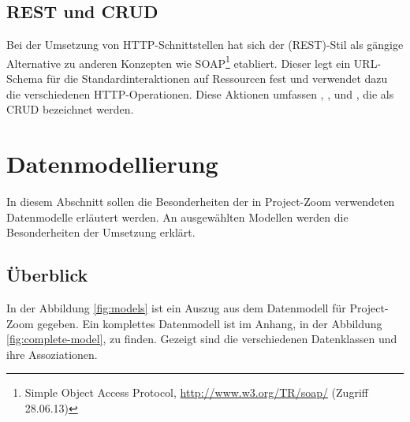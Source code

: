 \subsection{REST und CRUD}

Bei der Umsetzung von HTTP-Schnittstellen hat sich der  (REST)-Stil als gängige Alternative zu anderen Konzepten wie SOAP\footnote{Simple Object Access Protocol, \url{http://www.w3.org/TR/soap/} (Zugriff 28.06.13)} etabliert. Dieser legt ein URL-Schema für die Standardinteraktionen auf \gls{Ressource}n fest und verwendet dazu die verschiedenen HTTP-Operationen. Diese Aktionen umfassen , ,  und , die als CRUD bezeichnet werden.


\section{Datenmodellierung}
\label{sec:model}
In diesem Abschnitt sollen die Besonderheiten der in Project-Zoom verwendeten Datenmodelle erläutert werden. An ausgewählten Modellen werden die Besonderheiten der Umsetzung erklärt.

\subsection{Überblick}

In der Abbildung \ref{fig:models} ist ein Auszug aus dem Datenmodell für Project-Zoom gegeben. Ein komplettes Datenmodell ist im Anhang, in der Abbildung \ref{fig:complete-model}, zu finden. Gezeigt sind die verschiedenen Datenklassen und ihre Assoziationen. 

